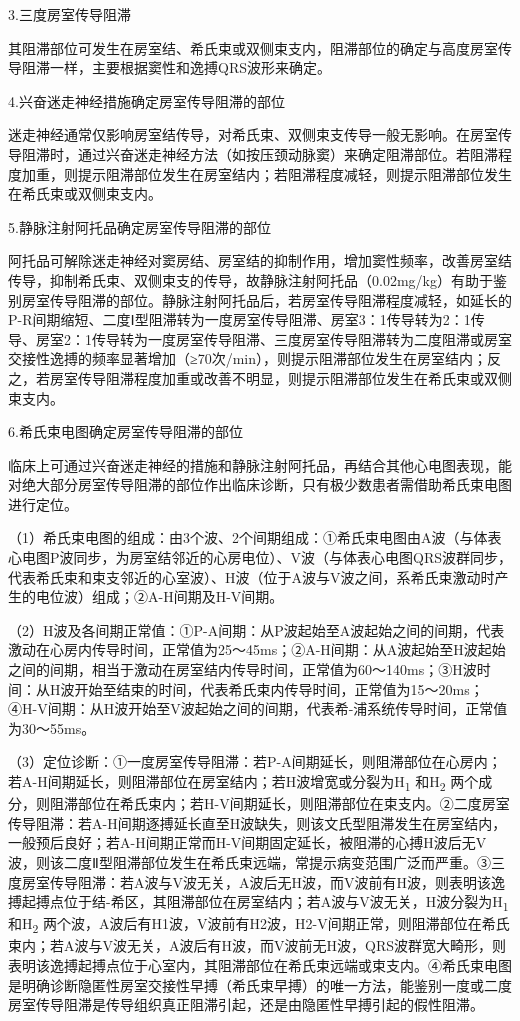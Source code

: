 3.三度房室传导阻滞

其阻滞部位可发生在房室结、希氏束或双侧束支内，阻滞部位的确定与高度房室传导阻滞一样，主要根据窦性和逸搏QRS波形来确定。

4.兴奋迷走神经措施确定房室传导阻滞的部位

迷走神经通常仅影响房室结传导，对希氏束、双侧束支传导一般无影响。在房室传导阻滞时，通过兴奋迷走神经方法（如按压颈动脉窦）来确定阻滞部位。若阻滞程度加重，则提示阻滞部位发生在房室结内；若阻滞程度减轻，则提示阻滞部位发生在希氏束或双侧束支内。

5.静脉注射阿托品确定房室传导阻滞的部位

阿托品可解除迷走神经对窦房结、房室结的抑制作用，增加窦性频率，改善房室结传导，抑制希氏束、双侧束支的传导，故静脉注射阿托品（0.02mg/kg）有助于鉴别房室传导阻滞的部位。静脉注射阿托品后，若房室传导阻滞程度减轻，如延长的P-R间期缩短、二度Ⅰ型阻滞转为一度房室传导阻滞、房室3：1传导转为2：1传导、房室2：1传导转为一度房室传导阻滞、三度房室传导阻滞转为二度阻滞或房室交接性逸搏的频率显著增加（≥70次/min），则提示阻滞部位发生在房室结内；反之，若房室传导阻滞程度加重或改善不明显，则提示阻滞部位发生在希氏束或双侧束支内。

6.希氏束电图确定房室传导阻滞的部位

临床上可通过兴奋迷走神经的措施和静脉注射阿托品，再结合其他心电图表现，能对绝大部分房室传导阻滞的部位作出临床诊断，只有极少数患者需借助希氏束电图进行定位。

（1）希氏束电图的组成：由3个波、2个间期组成：①希氏束电图由A波（与体表心电图P波同步，为房室结邻近的心房电位）、V波（与体表心电图QRS波群同步，代表希氏束和束支邻近的心室波）、H波（位于A波与V波之间，系希氏束激动时产生的电位波）组成；②A-H间期及H-V间期。

（2）H波及各间期正常值：①P-A间期：从P波起始至A波起始之间的间期，代表激动在心房内传导时间，正常值为25～45ms；②A-H间期：从A波起始至H波起始之间的间期，相当于激动在房室结内传导时间，正常值为60～140ms；③H波时间：从H波开始至结束的时间，代表希氏束内传导时间，正常值为15～20ms；④H-V间期：从H波开始至V波起始之间的间期，代表希-浦系统传导时间，正常值为30～55ms。

（3）定位诊断：①一度房室传导阻滞：若P-A间期延长，则阻滞部位在心房内；若A-H间期延长，则阻滞部位在房室结内；若H波增宽或分裂为H\textsubscript{1}
和H\textsubscript{2}
两个成分，则阻滞部位在希氏束内；若H-V间期延长，则阻滞部位在束支内。②二度房室传导阻滞：若A-H间期逐搏延长直至H波缺失，则该文氏型阻滞发生在房室结内，一般预后良好；若A-H间期正常而H-V间期固定延长，被阻滞的心搏H波后无V波，则该二度Ⅱ型阻滞部位发生在希氏束远端，常提示病变范围广泛而严重。③三度房室传导阻滞：若A波与V波无关，A波后无H波，而V波前有H波，则表明该逸搏起搏点位于结-希区，其阻滞部位在房室结内；若A波与V波无关，H波分裂为H\textsubscript{1}
和H\textsubscript{2}
两个波，A波后有H1波，V波前有H2波，H2-V间期正常，则阻滞部位在希氏束内；若A波与V波无关，A波后有H波，而V波前无H波，QRS波群宽大畸形，则表明该逸搏起搏点位于心室内，其阻滞部位在希氏束远端或束支内。④希氏束电图是明确诊断隐匿性房室交接性早搏（希氏束早搏）的唯一方法，能鉴别一度或二度房室传导阻滞是传导组织真正阻滞引起，还是由隐匿性早搏引起的假性阻滞。

